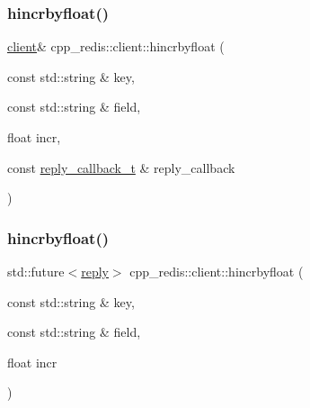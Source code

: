 \mbox{\label{classcpp__redis_1_1client_ade2a386b51e8bbd59cd7feef51bd0637}} 
\subsubsection{\texorpdfstring{hincrbyfloat()}{hincrbyfloat()}\hspace{0.1cm}{\footnotesize\ttfamily [1/2]}}
{\footnotesize\ttfamily \hyperlink{classcpp__redis_1_1client}{client}\& cpp\+\_\+redis\+::client\+::hincrbyfloat (\begin{DoxyParamCaption}\item[{const std\+::string \&}]{key,  }\item[{const std\+::string \&}]{field,  }\item[{float}]{incr,  }\item[{const \hyperlink{classcpp__redis_1_1client_a061a1140d36d2eaeda82b09a0bb3f9f2}{reply\+\_\+callback\+\_\+t} \&}]{reply\+\_\+callback }\end{DoxyParamCaption})}

\mbox{\label{classcpp__redis_1_1client_a6b856272a5956b3b2839c5b5749c9b97}} 
\subsubsection{\texorpdfstring{hincrbyfloat()}{hincrbyfloat()}\hspace{0.1cm}{\footnotesize\ttfamily [2/2]}}
{\footnotesize\ttfamily std\+::future$<$\hyperlink{classcpp__redis_1_1reply}{reply}$>$ cpp\+\_\+redis\+::client\+::hincrbyfloat (\begin{DoxyParamCaption}\item[{const std\+::string \&}]{key,  }\item[{const std\+::string \&}]{field,  }\item[{float}]{incr }\end{DoxyParamCaption})}

\mbox{\label{classcpp__redis_1_1client_a432f322ff1818fa65208725b1be7f4d2}} 
